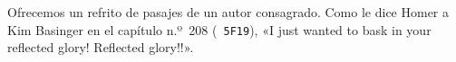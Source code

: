 Ofrecemos un refrito de pasajes de un autor consagrado. Como
le dice Homer a Kim Basinger en el capítulo n.º 208 ({\tt
5F19}),
%
%
«I just wanted to bask in your reflected glory!  Reflected
glory!!».

